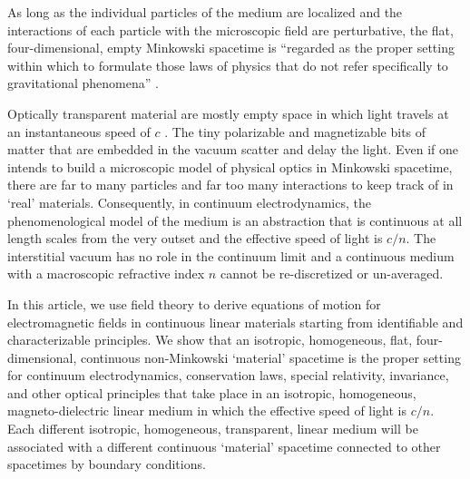 \documentclass[twocolumn,amssymb,eqsecnum,aps,pra]{revtex4-2}
\begin{document}
As long as the individual particles of the medium are localized and
the interactions of each particle with the microscopic field are
perturbative, the flat, four-dimensional, empty Minkowski spacetime
is ``regarded as the proper setting within which to formulate those
laws of physics that do not refer specifically to gravitational
phenomena'' \cite{BINabor}.
\par
Optically transparent material are mostly empty space in which
light travels at an instantaneous speed of $c$ \cite{BIBorn}.
The tiny polarizable and magnetizable bits of matter that are embedded
in the vacuum scatter and delay the light.
Even if one intends to build a microscopic model of physical optics in
Minkowski spacetime, there are far to many particles and far too many
interactions to keep track of in `real' materials.
Consequently, in continuum electrodynamics, the phenomenological model
of the medium is an abstraction that is continuous at all length
scales from the very outset and the effective speed of light is $c/n$.
The interstitial vacuum has no role in the continuum limit and
a continuous medium with a macroscopic refractive index $n$ cannot
be re-discretized or un-averaged.
\par
In this article, we use field theory to derive equations of motion 
for electromagnetic fields in continuous linear materials starting
from identifiable and characterizable principles.
We show that an isotropic, homogeneous, flat, four-dimensional,
continuous non-Minkowski `material' spacetime is the proper
setting for continuum electrodynamics, conservation laws,
special relativity, invariance, and other optical principles
that take place in an isotropic, homogeneous, magneto-dielectric
linear medium in which the effective speed of light is $c/n$.
Each different isotropic, homogeneous, transparent, linear medium will
be associated with a different continuous `material' spacetime
connected to other spacetimes by boundary conditions.
\par
\end{document}

